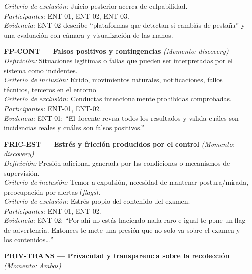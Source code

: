 \begin{center}
\begin{infobox}
\textit{Criterio de exclusión:} Juicio posterior acerca de culpabilidad.\\
\textit{Participantes:} ENT-01, ENT-02, ENT-03.\\
\textit{Evidencia:} ENT-02 describe ``plataformas que detectan si cambiás de pestaña'' y una evaluación con cámara y visualización de las manos.
\end{infobox}
\vspace{2pt}
\begin{infobox}
\textbf{\textcolor{accent}{FP-CONT --- Falsos positivos y contingencias}} \textit{(Momento: \textit{discovery})}\\
\textit{Definición:} Situaciones legítimas o fallas que pueden ser interpretadas por el sistema como incidentes.\\
\textit{Criterio de inclusión:} Ruido, movimientos naturales, notificaciones, fallos técnicos, terceros en el entorno.\\
\textit{Criterio de exclusión:} Conductas intencionalmente prohibidas comprobadas.\\
\textit{Participantes:} ENT-01, ENT-02.\\
\textit{Evidencia:} ENT-01: ``El docente revisa todos los resultados y valida cuáles son incidencias reales y cuáles son falsos positivos.''
\end{infobox}
\vspace{2pt}
\begin{infobox}
\textbf{\textcolor{accent}{FRIC-EST --- Estrés y fricción producidos por el control}} \textit{(Momento: \textit{discovery})}\\
\textit{Definición:} Presión adicional generada por las condiciones o mecanismos de supervisión.\\
\textit{Criterio de inclusión:} Temor a expulsión, necesidad de mantener postura/mirada, preocupación por alertas (\textit{flags}).\\
\textit{Criterio de exclusión:} Estrés propio del contenido del examen.\\
\textit{Participantes:} ENT-01, ENT-02.\\
\textit{Evidencia:} ENT-02: ``Por ahí no estás haciendo nada raro e igual te pone un flag de advertencia. Entonces te mete una presión que no solo va sobre el examen y los contenidos…''
\end{infobox}
\vspace{2pt}
\begin{infobox}
\textbf{\textcolor{accent}{PRIV-TRANS --- Privacidad y transparencia sobre la recolección}} \textit{(Momento: Ambos)}\\

\end{infobox}
\end{center}
